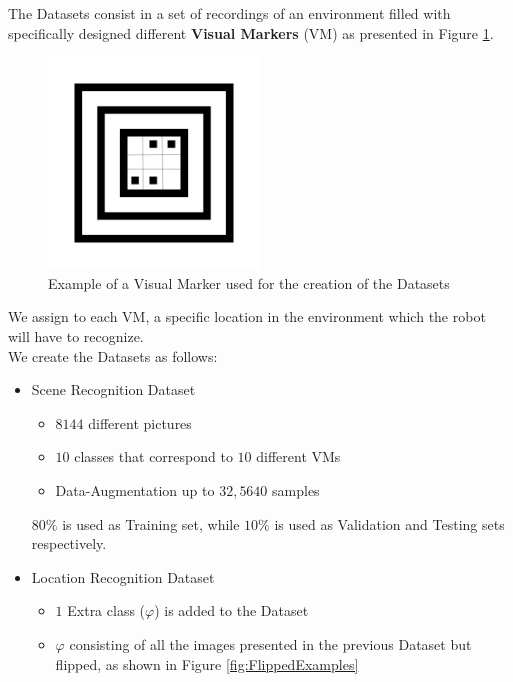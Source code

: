 \documentclass[a0, portrait]{IWIposter}
\begin{document}
\begin{multicols}{3}
The Datasets consist in a set of recordings of an environment filled with specifically designed different \textbf{Visual Markers} (VM) as presented in Figure \ref{fig:VisualMarker}. \\

\begin{figure}[H]
	\centering
	\includegraphics[width=0.5\textwidth]{VisualMarker.png}
	\caption{Example of a Visual Marker used for the creation of the Datasets}
	\label{fig:VisualMarker}
\end{figure}

We assign to each VM, a specific location in the environment which the robot will have to recognize. \\
We create the Datasets as follows:  

\begin{itemize}

\item Scene Recognition Dataset

	\begin{itemize}
	\item $8144$ different pictures
	\item $10$ classes that correspond to $10$ different VMs
	\item Data-Augmentation up to $32,5640$ samples
	\end{itemize}

$80\%$ is used as Training set, while $10\%$ is used as Validation and Testing sets respectively.

\item Location Recognition Dataset

	\begin{itemize}
	\item $1$ Extra class ($\varphi$) is added to the Dataset
	\item $\varphi$ consisting of all the images presented in the previous Dataset but flipped, as shown in Figure \ref{fig:FlippedExamples}
	\end{itemize}


\end{itemize}
\end{multicols}
\end{document}
